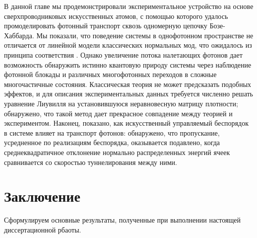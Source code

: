 \documentclass[14pt, a4paper]{extreport}
\numberwithin{equation}{section}
\begin{document}
В данной главе мы продемонстрировали экспериментальное устройство на основе сверхпроводниковых искусственных атомов, с помощью которого удалось промоделировать фотонный транспорт сквозь одномерную цепочку Бозе-Хаббарда. Мы показали, что поведение системы в однофотонном пространстве не отличается от линейной модели классических нормальных мод, что ожидалось из принципа соответствия \cite{park2012classical}. Однако увеличение потока налетающих фотонов дает возможность обнаружить истинно квантовую природу системы через наблюдение фотонной блокады и различных многофотонных переходов в сложные многочастичные состояния. Классическая теория не может предсказать подобных эффектов, и для описания экспериментальных данных требуется численно решать уравнение Лиувилля на установившуюся неравновесную матрицу плотности; обнаружено, что такой метод дает прекрасное совпадение между теорией и экспериментом. Наконец, показано, как искусственный управляемый беспорядок в системе влияет на транспорт фотонов: обнаружено, что пропускание, усредненное по реализациям беспорядка, оказывается подавлено, когда среднеквадратичное отклонение нормально распределенных энергий ячеек сравнивается со скоростью туннелирования между ними.

\chapter{Заключение}

Сформулируем основные результаты, полученные при выполнении настоящей диссертационной рбаоты.
\end{document}
